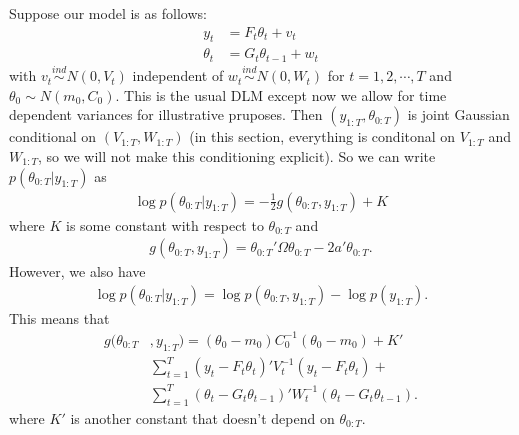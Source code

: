 \documentclass{article}
\begin{document}
Suppose our model is as follows:
\begin{align*}
  y_t &= F_t\theta_t + v_t\\
  \theta_t & = G_t\theta_{t-1} + w_t
\end{align*}
with $v_t\stackrel{ind}{\sim} N(0,V_t)$ independent of $w_t\stackrel{ind}{\sim}N(0,W_t)$ for $t=1,2,\cdots,T$ and $\theta_0\sim N(m_0,C_0)$. This is the usual DLM except now we allow for time dependent variances for illustrative pruposes. Then $(y_{1:T},\theta_{0:T})$ is joint Gaussian conditional on $(V_{1:T},W_{1:T})$ (in this section, everything is conditonal on $V_{1:T}$ and $W_{1:T}$, so we will not make this conditioning explicit). So we can write $p(\theta_{0:T}|y_{1:T})$ as
\begin{align*}
  \log p(\theta_{0:T}|y_{1:T}) = -\frac{1}{2}g(\theta_{0:T},y_{1:T}) + K
\end{align*}
where $K$ is some constant with respect to $\theta_{0:T}$ and
\begin{align*}
  g(\theta_{0:T},y_{1:T}) = \theta_{0:T}'\Omega\theta_{0:T} - 2a'\theta_{0:T}.
\end{align*}
However, we also have
\begin{align*}
  \log p(\theta_{0:T}|y_{1:T}) = \log p(\theta_{0:T},y_{1:T}) - \log p(y_{1:T}).
\end{align*}
This means that
\begin{align*}
  g(\theta_{0:T}&,y_{1:T}) = (\theta_0 - m_0)C_0^{-1}(\theta_0 - m_0) + K'\\
  & \sum_{t=1}^T(y_t - F_t\theta_t)'V_t^{-1}(y_t - F_t\theta_t) + \\
  & \sum_{t=1}^T(\theta_t - G_t\theta_{t-1})'W_t^{-1}(\theta_t - G_t\theta_{t-1}).
\end{align*}
where $K'$ is another constant that doesn't depend on $\theta_{0:T}$.
\end{document}
